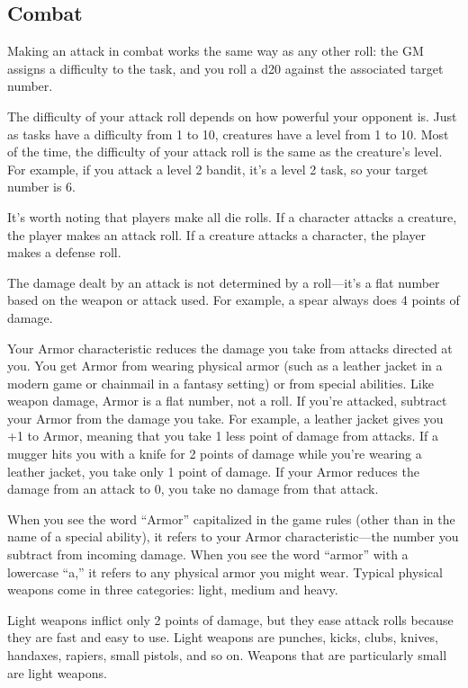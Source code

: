 \begin{multicols}{2}

\subsection{Combat}

Making an attack in combat works the same way as any other roll: the GM assigns a difficulty to the task, and you roll a d20 against the associated target number.

The difficulty of your attack roll depends on how powerful your opponent is. Just as tasks have a difficulty from 1 to 10, creatures have a level from 1 to 10. Most of the time, the difficulty of your attack roll is the same as the creature’s level. For example, if you attack a level 2 bandit, it’s a level 2 task, so your target number is 6.

It’s worth noting that players make all die rolls. If a character attacks a creature, the player makes an attack roll. If a creature attacks a character, the player makes a defense roll.

The damage dealt by an attack is not determined by a roll—it’s a flat number based on the weapon or attack used. For example, a spear always does 4 points of damage.

Your Armor characteristic reduces the damage you take from attacks directed at you. You get Armor from wearing physical armor (such as a leather jacket in a modern game or chainmail in a fantasy setting) or from special abilities. Like weapon damage, Armor is a flat number, not a roll. If you’re attacked, subtract your Armor from the damage you take. For example, a leather jacket gives you +1 to Armor, meaning that you take 1 less point of damage from attacks. If a mugger hits you with a knife for 2 points of damage while you’re wearing a leather jacket, you take only 1 point of damage. If your Armor reduces the damage from an attack to 0, you take no damage from that attack.

When you see the word “Armor” capitalized in the game rules (other than in the name of a special ability), it refers to your Armor characteristic—the number you subtract from incoming damage. When you see the word “armor” with a lowercase “a,” it refers to any physical armor you might wear.
Typical physical weapons come in three categories: light, medium and heavy.

Light weapons inflict only 2 points of damage, but they ease attack rolls because they are fast and easy to use. Light weapons are punches, kicks, clubs, knives, handaxes, rapiers, small pistols, and so on. Weapons that are particularly small are light weapons.


\end{multicols}
